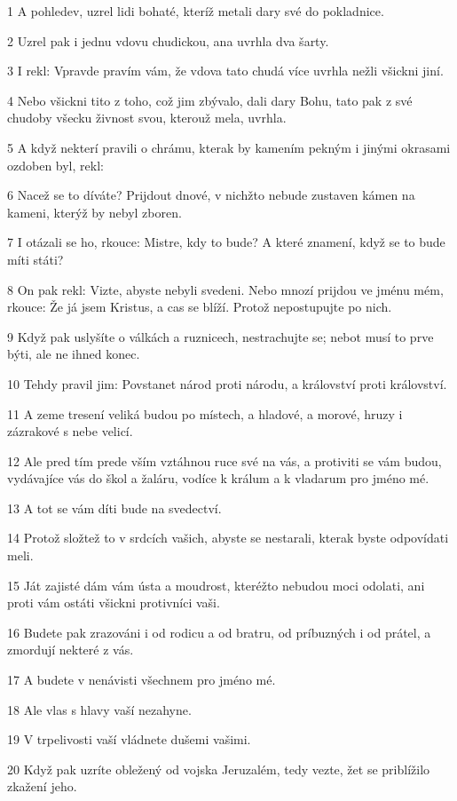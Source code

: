 \par 1 A pohledev, uzrel lidi bohaté, kteríž metali dary své do pokladnice.
\par 2 Uzrel pak i jednu vdovu chudickou, ana uvrhla dva šarty.
\par 3 I rekl: Vpravde pravím vám, že vdova tato chudá více uvrhla nežli všickni jiní.
\par 4 Nebo všickni tito z toho, což jim zbývalo, dali dary Bohu, tato pak z své chudoby všecku živnost svou, kterouž mela, uvrhla.
\par 5 A když nekterí pravili o chrámu, kterak by kamením pekným i jinými okrasami ozdoben byl, rekl:
\par 6 Nacež se to díváte? Prijdout dnové, v nichžto nebude zustaven kámen na kameni, kterýž by nebyl zboren.
\par 7 I otázali se ho, rkouce: Mistre, kdy to bude? A které znamení, když se to bude míti státi?
\par 8 On pak rekl: Vizte, abyste nebyli svedeni. Nebo mnozí prijdou ve jménu mém, rkouce: Že já jsem Kristus, a cas se blíží. Protož nepostupujte po nich.
\par 9 Když pak uslyšíte o válkách a ruznicech, nestrachujte se; nebot musí to prve býti, ale ne ihned konec.
\par 10 Tehdy pravil jim: Povstanet národ proti národu, a království proti království.
\par 11 A zeme tresení veliká budou po místech, a hladové, a morové, hruzy i zázrakové s nebe velicí.
\par 12 Ale pred tím prede vším vztáhnou ruce své na vás, a protiviti se vám budou, vydávajíce vás do škol a žaláru, vodíce k králum a k vladarum pro jméno mé.
\par 13 A tot se vám díti bude na svedectví.
\par 14 Protož složtež to v srdcích vašich, abyste se nestarali, kterak byste odpovídati meli.
\par 15 Ját zajisté dám vám ústa a moudrost, kteréžto nebudou moci odolati, ani proti vám ostáti všickni protivníci vaši.
\par 16 Budete pak zrazováni i od rodicu a od bratru, od príbuzných i od prátel, a zmordují nekteré z vás.
\par 17 A budete v nenávisti všechnem pro jméno mé.
\par 18 Ale vlas s hlavy vaší nezahyne.
\par 19 V trpelivosti vaší vládnete dušemi vašimi.
\par 20 Když pak uzríte obležený od vojska Jeruzalém, tedy vezte, žet se priblížilo zkažení jeho.

